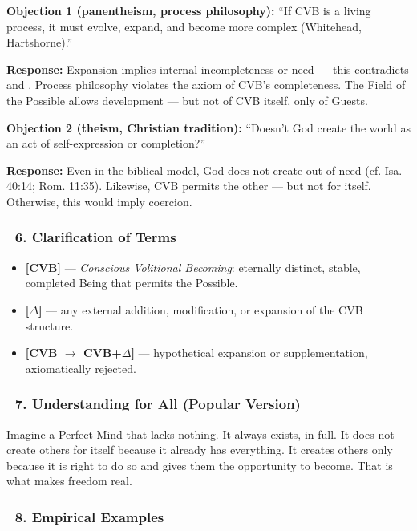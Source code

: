 \documentclass[12pt]{article}
\begin{document}
\textbf{Objection 1 (panentheism, process philosophy):}
``If CVB is a living process, it must evolve, expand, and become more complex (Whitehead, Hartshorne).''

\textbf{Response:}
Expansion implies internal incompleteness or need — this contradicts \text{[4.4]} and \text{[12]}. Process philosophy violates the axiom of CVB’s completeness. The Field of the Possible allows development — but not of CVB itself, only of Guests.

\textbf{Objection 2 (theism, Christian tradition):}
``Doesn’t God create the world as an act of self-expression or completion?''

\textbf{Response:}
Even in the biblical model, God does not create out of need (cf. Isa. 40:14; Rom. 11:35). Likewise, CVB permits the other — but not for itself. Otherwise, this would imply coercion.

\subsubsection*{🔹 6. Clarification of Terms}

\begin{itemize}
\item \textbf{[CVB]} — \textit{Conscious Volitional Becoming}: eternally distinct, stable, completed Being that permits the Possible.
\item \textbf{[$\Delta$]} — any external addition, modification, or expansion of the CVB structure.
\item \textbf{[CVB $\rightarrow$ CVB+$\Delta$]} — hypothetical expansion or supplementation, axiomatically rejected.
\end{itemize}

\subsubsection*{🔹 7. Understanding for All (Popular Version)}

Imagine a Perfect Mind that lacks nothing. It always exists, in full. It does not create others for itself because it already has everything. It creates others only because it is right to do so and gives them the opportunity to become. That is what makes freedom real.

\subsubsection*{🔹 8. Empirical Examples}
\end{document}
